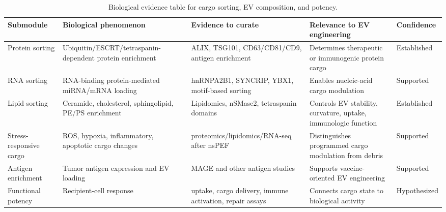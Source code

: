 \begin{table}[t]
\footnotesize\sf
\centering
\caption{Biological evidence table for cargo sorting, EV composition, and potency.\label{T_A11_bio_cargo}}
\begin{tabular}{p{2.7cm} p{3.4cm} p{4.2cm} p{3.0cm} p{2.0cm}}
\toprule
\textbf{Submodule} & \textbf{Biological phenomenon} & \textbf{Evidence to curate} & \textbf{Relevance to EV engineering} & \textbf{Confidence} \\
\midrule
Protein sorting & Ubiquitin/ESCRT/tetraspanin-dependent protein enrichment & ALIX, TSG101, CD63/CD81/CD9, antigen enrichment & Determines therapeutic or immunogenic protein cargo & Established \cite{jeppesen2019reassessment,kugeratski2021quantitative,takahashi2015hrs,larios2020alix,rubinstein2025tetraspanins} \\
RNA sorting & RNA-binding protein-mediated miRNA/mRNA loading & hnRNPA2B1, SYNCRIP, YBX1, motif-based sorting & Enables nucleic-acid cargo modulation & Supported \cite{shurtleff2016ybox,liu2021selective,santangelo2016syncrip} \\
Lipid sorting & Ceramide, cholesterol, sphingolipid, PE/PS enrichment & Lipidomics, nSMase2, tetraspanin domains & Controls EV stability, curvature, uptake, immunologic function & Established \cite{skotland2023lipids,choezom2022nsmase2,crivelli2022ceramideTransfer,rubinstein2025tetraspanins} \\
Stress-responsive cargo & ROS, hypoxia, inflammatory, apoptotic cargo changes & proteomics/lipidomics/RNA-seq after nsPEF & Distinguishes programmed cargo modulation from debris & Supported \cite{pakhomova2012oxidative,cappe2023systematic,muratori2017activation} \\
Antigen enrichment & Tumor antigen expression and EV loading & MAGE and other antigen studies & Supports vaccine-oriented EV engineering & Supported \cite{szlasa2024mage,kumar2022tumour} \\
Functional potency & Recipient-cell response & uptake, cargo delivery, immune activation, repair assays & Connects cargo state to biological activity & Hypothesized \cite{hagey2023cellular,tkach2017qualitative,fuhrmann2015active} \\
\bottomrule
\end{tabular}
\end{table}

